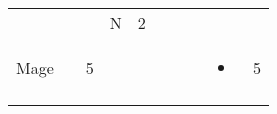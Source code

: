 \documentclass[12pt]{article}
\begin{document}
\begin{longtable}[]{@{}llllllllll@{}}
\begin{minipage}[t]{0.06\columnwidth}\raggedright\strut
\strut\end{minipage} &
\begin{minipage}[t]{0.06\columnwidth}\raggedright\strut
\strut\end{minipage} &
\begin{minipage}[t]{0.06\columnwidth}\raggedright\strut
\strut\end{minipage} &
\begin{minipage}[t]{0.07\columnwidth}\raggedright\strut
N
\strut\end{minipage} &
\begin{minipage}[t]{0.08\columnwidth}\raggedright\strut
2
\strut\end{minipage}\tabularnewline
\begin{minipage}[t]{0.13\columnwidth}\raggedright\strut
Mage
\strut\end{minipage} &
\begin{minipage}[t]{0.06\columnwidth}\raggedright\strut
\strut\end{minipage} &
\begin{minipage}[t]{0.06\columnwidth}\raggedright\strut
5
\strut\end{minipage} &
\begin{minipage}[t]{0.06\columnwidth}\raggedright\strut
\strut\end{minipage} &
\begin{minipage}[t]{0.06\columnwidth}\raggedright\strut
\strut\end{minipage} &
\begin{minipage}[t]{0.06\columnwidth}\raggedright\strut
\strut\end{minipage} &
\begin{minipage}[t]{0.06\columnwidth}\raggedright\strut
\strut\end{minipage} &
\begin{minipage}[t]{0.06\columnwidth}\raggedright\strut
\strut\end{minipage} &
\begin{minipage}[t]{0.07\columnwidth}\raggedright\strut
\begin{itemize}
\item
\end{itemize}
\strut\end{minipage} &
\begin{minipage}[t]{0.08\columnwidth}\raggedright\strut
5
\strut\end{minipage}\tabularnewline
\begin{minipage}[t]{0.13\columnwidth}\raggedright\strut

\end{minipage}
\end{longtable}
\end{document}
